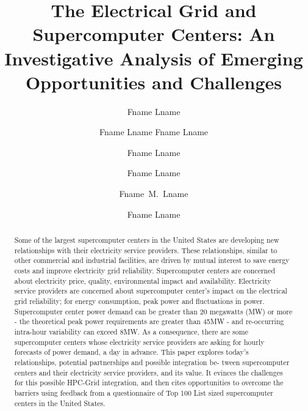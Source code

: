\documentclass[runningheads]{llncs}
\begin{document}
%
\frontmatter          %
%
\pagestyle{headings}  %
%
%
\mainmatter              %
%
\title{
The Electrical Grid and Supercomputer Centers:  
An Investigative Analysis of Emerging Opportunities and Challenges
}

%
%
%
\author{Fname Lname \and Fname Lname
Fname Lname \and Fname Lname \and Fname Lname \and Fname~M.~Lname \and
Fname Lname}
%
%
%

\maketitle              %

\begin{abstract}
Some of the largest supercomputer centers in the United States are developing new relationships with their electricity service providers. 
These relationships, similar to other commercial and industrial facilities, are driven by mutual interest to save energy costs and improve electricity grid reliability.
Supercomputer centers are concerned about electricity price, quality, environmental impact and availability.
Electricity service providers are concerned about supercomputer center’s impact on the electrical grid reliability; for energy consumption, peak power and fluctuations in power.
Supercomputer center power demand can be greater than 20 megawatts (MW) or more - the theoretical peak power requirements are greater than 45MW - and re-occurring intra-hour variability can exceed 8MW.
As a consequence, there are some supercomputer centers whose electricity service providers are asking for hourly forecasts of power demand, a day in advance.
This paper explores today’s relationships, potential partnerships and possible integration be- tween supercomputer centers and their electricity service providers, and its value.
It evinces the challenges for this possible HPC-Grid integration, and then cites opportunities to overcome the barriers using feedback from a questionnaire of Top 100 List sized supercomputer centers in the United States.
\end{abstract}
\end{document}
